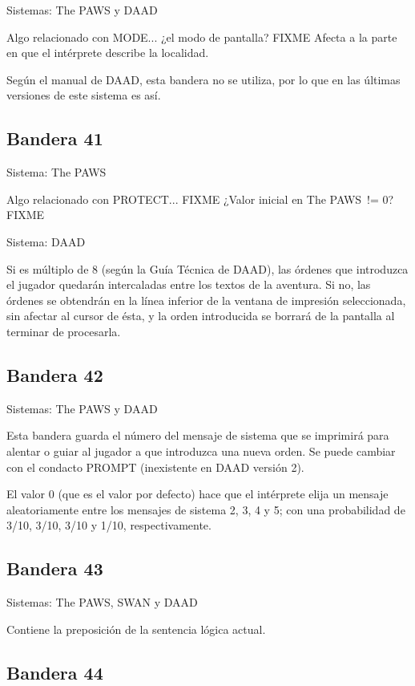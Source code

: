 \documentclass[11pt, a5paper]{article}
\newcommand{\paw}{\textsf{The PAWS}\xspace}
\newcommand{\swan}{\textsf{SWAN}\xspace}
\newcommand{\daad}{\textsf{DAAD}\xspace}
\newcommand{\sistema}[1]{\noindent Sistema: #1 \nopagebreak}
\newcommand{\sistemas}[1]{\noindent Sistemas: #1 \nopagebreak}
\begin{document}
\sistemas{\paw y \daad}

Algo relacionado con MODE... ¿el modo de pantalla? FIXME
Afecta a la parte en que el intérprete describe la localidad.

Según el manual de \daad, esta bandera no se utiliza, por lo que en las últimas versiones de este sistema es así.

\subsection{Bandera 41}

\sistema{\paw}

Algo relacionado con PROTECT... FIXME
¿Valor inicial en \paw\ != 0? FIXME

\sistema{\daad}

Si es múltiplo de 8 (según la Guía Técnica de \daad \cite[pág. 61]{DAAD}), las órdenes que introduzca el jugador quedarán intercaladas entre los textos de la aventura. Si no, las órdenes se obtendrán en la línea inferior de la ventana de impresión seleccionada, sin afectar al cursor de ésta, y la orden introducida se borrará de la pantalla al terminar de procesarla.

\subsection{Bandera 42}

\sistemas{\paw y \daad}

Esta bandera guarda el número del mensaje de sistema que se imprimirá para alentar o guiar al jugador a que introduzca una nueva orden. Se puede cambiar con el condacto PROMPT (inexistente en \daad versión 2).

El valor 0 (que es el valor por defecto) hace que el intérprete elija un mensaje aleatoriamente entre los mensajes de sistema 2, 3, 4 y 5; con una probabilidad de 3/10, 3/10, 3/10 y 1/10, respectivamente.

\subsection{Bandera 43}

\sistemas{\paw, \swan y \daad}

Contiene la preposición de la sentencia lógica actual.

\subsection{Bandera 44}
\end{document}
